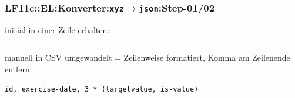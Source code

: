 

\begin{frame}[fragile]  
  \frametitle{LF11c::EL:Konverter:\texttt{xyz$\rightarrow$json}:Step-01/02} 

  \begin{footnotesize}
    initial in einer Zeile erhalten:
  \end{footnotesize}
  \begin{center}
  \begin{minipage}{0.95\textwidth}

    \inputminted [fontsize=\tiny]{python}{\dspLf/dsp.teta.xyz}
  \end{minipage}
  \end{center}
    
  \begin{footnotesize}
    manuell in CSV umgewandelt = Zeilenweise formatiert, Komma am Zeilenende entfernt
  \end{footnotesize}

  \begin{center}
  \begin{minipage}{0.8\textwidth}
    \begin{verbatim}
id, exercise-date, 3 * (targetvalue, is-value)
    \end{verbatim}
    \inputminted [fontsize=\footnotesize]{python}{\dspLf/dsp.teta.csv}
  \end{minipage} 
  \end{center}

\end{frame}

